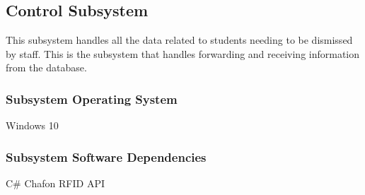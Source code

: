 \subsection{Control Subsystem}
This subsystem handles all the data related to students needing to be dismissed by staff. This is the
subsystem that handles forwarding and receiving information from the database.

\subsubsection{Subsystem Operating System}
Windows 10

\subsubsection{Subsystem Software Dependencies}
C\# Chafon RFID API

